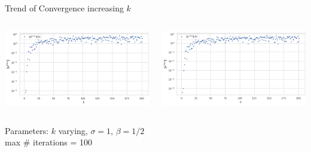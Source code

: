 \documentclass{beamer}
\begin{document}
\begin{frame}{Trend of Convergence increasing $k$}
	\begin{minipage}[0.95\textheight]{\textwidth}
	\begin{columns}[T]
	\begin{column}{0.50\textwidth}
	\includegraphics[width=\textwidth, keepaspectratio]{../images/d_conv_N.png}
	\end{column}
	\begin{column}{0.50\textwidth}
	\includegraphics[width=\textwidth, keepaspectratio]{../images/v_conv_N.png}
	\end{column}
	\end{columns}
	\end{minipage}
	\begin{center}
		Parameters: $k$ varying, $\sigma=1$, $\beta=1/2$\\
		max \# iterations = 100
	\end{center}
\end{frame}
\end{document}
